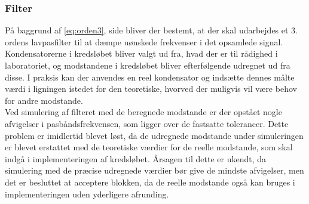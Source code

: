 \subsubsection{Filter}
På baggrund af \eqref{eq:orden3}, side \pageref{eq:orden} bliver der bestemt, at der skal udarbejdes et 3. ordens lavpasfilter til at dæmpe uønskede frekvenser i det opsamlede signal. Kondensatorerne i kredsløbet bliver valgt ud fra, hvad der er til rådighed i laboratoriet, og modstandene i kredsløbet bliver efterfølgende udregnet ud fra disse. I praksis kan der anvendes en reel kondensator og indsætte dennes målte værdi i ligningen istedet for den teoretiske, hvorved der muligvis vil være behov for andre modstande. \\%
Ved simulering af filteret med de beregnede modstande er der opstået nogle afvigelser i pasbåndsfrekvensen, som ligger over de fastsatte tolerancer. Dette problem er imidlertid blevet løst, da de udregnede modstande under simuleringen er blevet erstattet med de teoretiske værdier for de reelle modstande, som skal indgå i implementeringen af kredsløbet. Årsagen til dette er ukendt, da simulering med de præcise udregnede værdier bør give de mindste afvigelser, men det er besluttet at acceptere blokken, da de reelle modstande også kan bruges i implementeringen uden yderligere afrunding.

